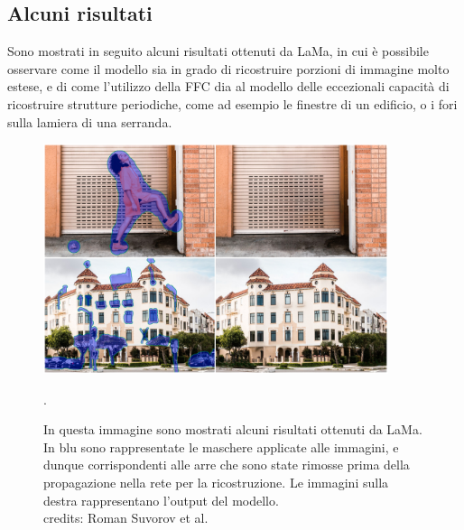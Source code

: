 \subsection{Alcuni risultati}
Sono mostrati in seguito alcuni risultati ottenuti da LaMa, in cui è possibile osservare come il modello sia in grado di ricostruire
porzioni di immagine molto estese, e di come l'utilizzo della FFC dia al modello delle eccezionali capacità di ricostruire 
strutture periodiche, come ad esempio le finestre di un edificio, o i fori sulla lamiera di una serranda.
    \begin{figure}[H]
        \centering
        \includegraphics[width=0.9\textwidth]{imgs/lama_results.png}
        \caption{In questa immagine sono mostrati alcuni risultati ottenuti da LaMa. In blu sono 
            rappresentate le maschere applicate alle immagini, e dunque corrispondenti alle arre che sono state rimosse prima
            della propagazione nella rete per la ricostruzione. Le immagini sulla destra rappresentano l'output del modello.\\
            credits: Roman Suvorov et al. \cite{suvorov2021resolutionrobust}}.
        \label{fig:lama_results}
    \end{figure}



